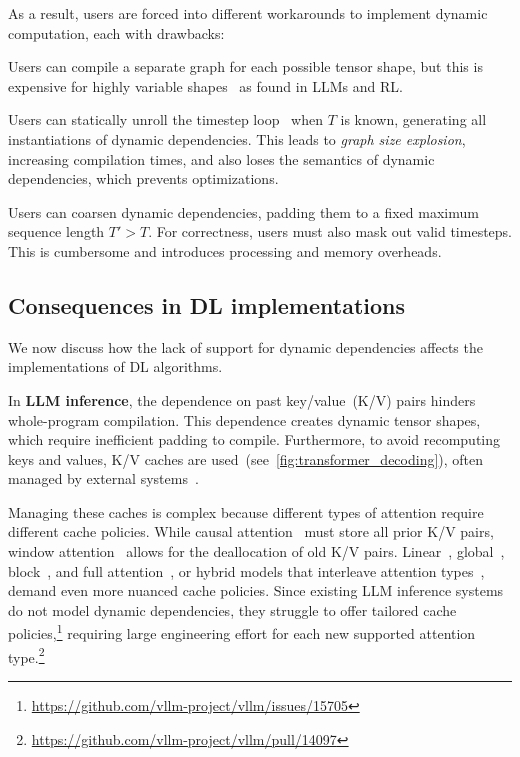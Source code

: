 As a result, users are forced into different workarounds to implement dynamic computation, 
each with drawbacks:

 Users can compile a separate graph for each possible tensor shape, but this is expensive for highly variable shapes~\cite{suhan2021lazytensor} as found in LLMs and RL.

 Users can statically unroll the timestep loop~\cite{frostig2018compiling} when $T$ is known, generating all instantiations of dynamic dependencies. This leads to \emph{graph size explosion}, increasing compilation times, and also loses the semantics of dynamic dependencies, which prevents optimizations.

 Users can coarsen dynamic dependencies, padding them to a fixed maximum sequence length $T'>T$. For correctness, users must also mask out valid timesteps. This is cumbersome and introduces processing and memory overheads.

\subsection{Consequences in DL implementations}
\label{sec:frameworks}

We now discuss how the lack of support for dynamic dependencies affects the implementations of DL algorithms.

\tinyskip

\noindent

In \textbf{LLM inference}, the dependence on past key/value~(K/V) pairs hinders whole-program compilation. This dependence creates dynamic tensor shapes, which require inefficient padding to compile. Furthermore, to avoid recomputing keys and values, K/V caches are used~(see~\F\ref{fig:transformer_decoding}), often managed by external systems~\cite{kwon2023efficient,qin2024mooncake}. 

Managing these caches is complex because different types of attention require different cache policies. 
While causal attention~\cite{vaswani2017attention} must store all prior K/V pairs, window attention~\cite{zaheer2020big} allows for the deallocation of old K/V pairs. Linear~\cite{katharopoulos2020transformers}, global~\cite{zaheer2020big}, block~\cite{dai2019transformer}, and full attention~\cite{devlin2019bert}, or hybrid models that interleave attention types~\cite{team2024gemma}, demand even more nuanced cache policies.
Since existing LLM inference systems~\cite{kwon2023efficient, zheng2024sglang} do not model dynamic dependencies, they struggle to offer tailored cache policies,\footnote{\url{https://github.com/vllm-project/vllm/issues/15705}} requiring large engineering effort for each new supported attention type.\footnote{\url{https://github.com/vllm-project/vllm/pull/14097}}




